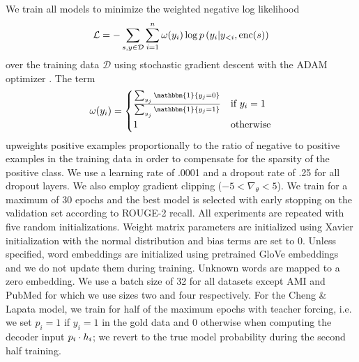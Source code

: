 We train all models to minimize the weighted negative log likelihood
\[\mathcal{L} = -\sum_{s,y\in \mathcal{D}} \sum_{i=1}^\docSize \omega(y_i) \log p\left(y_i|y_{<i},
\operatorname{enc}(\sent)\right)\]
over the training data $\mathcal{D}$
using stochastic gradient descent with the ADAM optimizer 
\cite{kingma2014adam}. The term 
\[ \omega(y_i)=\begin{cases}
\frac{\sum_{y_j} \mathbbm{1}\{y_j = 0 \}}{ \sum_{y_j} \mathbbm{1}\{y_j = 1 \}  } & \textrm{if $y_i=1$} \\ 1 & \textrm{otherwise}  \end{cases} \] 
        upweights
    positive examples proportionally to the ratio of negative to positive
    examples in the training data in order to compensate for the sparsity
    of the positive class.
    We use a learning rate of .0001 and a dropout rate of .25 for all dropout
    layers. We also employ gradient clipping ($-5 < \nabla_\theta < 5$). 
    We train for a maximum of 30 epochs and the best
    model is selected with early stopping on the validation set according
    to ROUGE-2 recall. All experiments are repeated with five random
    initializations. Weight matrix parameters are initialized using 
    Xavier initialization with the normal distribution 
    \cite{glorot2010understanding} and bias terms are set to 0.
    Unless specified, word embeddings are initialized 
    using pretrained GloVe embeddings \cite{pennington2014glove} and we do 
    not update them during training. Unknown words are mapped to a zero 
    embedding.
    We use a batch size of 32 for all datasets except AMI and PubMed for
    which we use sizes two and four respectively. 
    For the Cheng \& Lapata model, we train for half of the maximum epochs 
    with teacher forcing, i.e. we set $p_i = 1$
    if $y_i = 1$ in the gold data and 0 otherwise 
    when computing the decoder input 
    $p_i \cdot \sentEmb[i]$; we revert to the true model probability 
    during the second half training.

